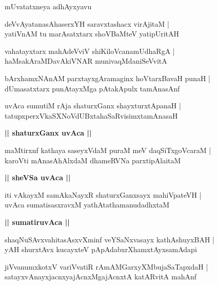 \documentclass[twoside,12pt,openright]{book}
\newcounter{shloka}[chapter]
\def\uvaca#1{\centerline{{\large\textbf{#1}}}}
\begin{document}
\begin{center}
mUvatatxneya adhAyxyavu
\end{center}

\begin{shloka}%
deVvAyatanasAhaserxYH saravxtashacx virAjitaM |\\
yatiVnAM  tu marAsatxtarx shoVBaMteV yatipUritAH 
\end{shloka}

\begin{shloka}%
vahatayxtarx mahAdeVviV shiKiloVcanamUdhaRgA |\\
haMsakAraMDavAkiVNAR munivaqMdaniSeVvitA 
\end{shloka}

\begin{shloka}%
bArxhamxNAnAM parxtayxgAramaginx hoVtarxBavaH punaH |\\
dUmasatxtarx punAtayxMga pAtakApulx tamAnasAnf 
\end{shloka}

\begin{shloka}%
uvAca sumutiM rAja shaturxGanx shayxturxtApanaH |\\
tatupxperxVkaSXNoVdUBxtahaSaRvisimxtamAnasaH 
\end{shloka}

\uvaca{|| shaturxGanx uvAca ||}

\begin{shloka}%
maMtirxnf kathaya saseyxVdaM puraM meV daqSiTxgoVcaraM |\\
karoVti mAnasAhAlxdaM dhameRVNa parxtipAlaitaM 
\end{shloka}

\uvaca{|| sheVSa uvAca ||}

\begin{shloka}%
iti vAkayxM samAkaNayxR shaturxGanxsayx mahiVpateVH |\\
uvAca sumatisasxravxM yathAtathamanudadhxtaM 
\end{shloka}

\uvaca{|| sumatiruvAca ||}

\begin{shloka}%
shaqNuSAvxvahitasAsxvXminf veYSaNxvasayx kathAshuyxBAH |\\
yAH shurxtAvx kucayxteV pApAdabxrXhamxtAyxsamAdapi
\end{shloka}

\begin{shloka}%
jiVvanumxkotxV variVvatiR rAmAMGarxyXMbujaSaTapxdaH |\\
satayxvAnayxjacnxyajAcnxMgajAcnxtA katARvitA mahAnf 
\end{shloka}
\end{document}
